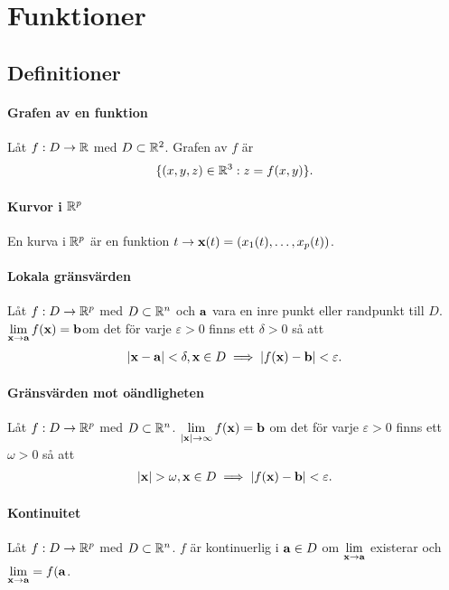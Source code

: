 \section{Funktioner}

\subsection{Definitioner}

\paragraph{Grafen av en funktion}
Låt $f: D\to\mathbb{R}$ med $D\subset\mathbb{R}^2$. Grafen av $f$ är
\begin{align*}
	\{(x, y, z)\in\mathbb{R}^3: z = f(x, y)\}.
\end{align*}

\paragraph{Kurvor i $\mathbb{R}^p$}
En kurva i $\mathbb{R}^p$ är en funktion $t\to\vect{x}(t) = (x_1(t), \dots, x_p(t))$.

\paragraph{Lokala gränsvärden}
Låt $f: D\to\mathbb{R}^p$ med $D\subset\mathbb{R}^n$ och $\vect{a}$ vara en inre punkt eller randpunkt till $D$. $\limit{\vect{x}}{\vect{a}}f(\vect{x}) = \vect{b}$om det för varje $\varepsilon > 0$ finns ett $\delta > 0$ så att
\begin{align*}
	\abs{\vect{x} - \vect{a}} < \delta, \vect{x}\in D \implies\abs{f(\vect{x}) - \vect{b}} < \varepsilon.
\end{align*}

\paragraph{Gränsvärden mot oändligheten}
Låt $f: D\to\mathbb{R}^p$ med $D\subset\mathbb{R}^n$. $\limit{\abs{\vect{x}}}{\infty}f(\vect{x}) = \vect{b}$ om det för varje $\varepsilon > 0$ finns ett $\omega > 0$ så att
\begin{align*}
	\abs{\vect{x}} > \omega, \vect{x}\in D \implies\abs{f(\vect{x}) - \vect{b}} < \varepsilon.
\end{align*}

\paragraph{Kontinuitet}
Låt $f: D\to\mathbb{R}^p$ med $D\subset\mathbb{R}^n$. $f$ är kontinuerlig i $\vect{a}\in D$ om $\limit{\vect{x}}{\vect{a}}$ existerar och $\limit{\vect{x}}{\vect{a}} = f(\vect{a}$.

